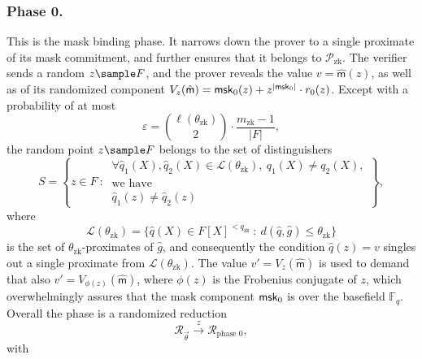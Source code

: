 \subsubsection{Phase 0.}
This is the mask binding phase.
It narrows down the prover to a single proximate of its mask commitment, and further ensures that it belongs to $\mathscr P_\text{zk}$.
The verifier sends a random $z\sample F$, and the prover reveals the value $v = \hat{\mathsf m}(z)$, as well as of its randomized component $V_z(\hat{\mathsf m}) = \mathsf{msk}_0(z) + z^{|\mathsf{msk}_0|}\cdot r_0(z)$.
Except with a probability of at most
\begin{equation}
\label{e:soundness:error:distinguishing}
\varepsilon = \binom{\ell(\theta_\text{zk})}{2} \cdot \frac{m_\text{zk} - 1}{|F|},
\end{equation}
the random point $z\sample F$ belongs to the set of distinguishers 
\begin{equation}
\label{e:S}
S = \left\{ z\in F 
\::\: 
\begin{matrix}
\forall \hat q_1(X),\hat q_2(X)\in \mathcal L(\theta_\text{zk}),
\:
q_1(X) \neq q_2(X),
\\
\text{we have}
\\
\hat q_1(z)\neq \hat q_2(z) 
\end{matrix}
\right\},
\end{equation}
where 
\[
\mathcal L(\theta_\text{zk}) = 
\big\{\hat q(X) \in F[X]^{<q_\text{zk}} \::\: d(\hat q, \hat g) \leq \theta_\text{zk}
\big\}
\]
is the set of $\theta_\text{zk}$-proximates of $\hat g$, and consequently the condition $\hat q(z) = v$ singles out a single proximate from $\mathcal L(\theta_\text{zk})$.
The value $v' = V_z(\hat{\mathsf m})$ is used to demand that also $v' = V_{\phi(z)}(\hat{\mathsf m})$, where $\phi(z)$ is the Frobenius conjugate of $z$, which overwhelmingly assures that the mask component $\mathsf{msk}_0$ is over the basefield $\mathbb F_q$.
Overall the phase is a randomized reduction 
\[
\mathcal R_{\vec\theta} \stackrel{z}{\longrightarrow} \mathcal R_\text{phase 0},
\]
with
